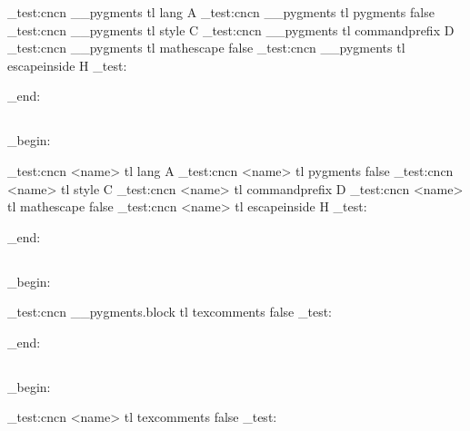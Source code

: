 \CDR_test:cncn { __pygments } { tl } { lang } { A }
\CDR_test:cncn { __pygments } { tl } { pygments } { false }
\CDR_test:cncn { __pygments } { tl } { style } { C }
\CDR_test:cncn { __pygments } { tl } { commandprefix } { D }
\CDR_test:cncn { __pygments } { tl } { mathescape } { false }
\CDR_test:cncn { __pygments } { tl } { escapeinside } { H }
\CDR_test:

\group_end:
\ExplSyntaxOff

\subsection{}
\ExplSyntaxOn
\group_begin:
{}

\CDR_test:cncn { <name> } { tl } { lang } { A }
\CDR_test:cncn { <name> } { tl } { pygments } { false }
\CDR_test:cncn { <name> } { tl } { style } { C }
\CDR_test:cncn { <name> } { tl } { commandprefix } { D }
\CDR_test:cncn { <name> } { tl } { mathescape } { false }
\CDR_test:cncn { <name> } { tl } { escapeinside } { H }
\CDR_test:

\group_end:
\ExplSyntaxOff

\subsection{}
\ExplSyntaxOn
\group_begin:


\CDR_test:cncn { __pygments.block } { tl } { texcomments} { false }
\CDR_test:

\group_end:
\ExplSyntaxOff

\subsection{}

\ExplSyntaxOn
\group_begin:
\ExplSyntaxOff



\ExplSyntaxOn
\CDR_test:cncn { <name> } { tl } { texcomments } { false }
\CDR_test:

